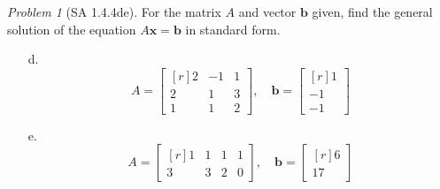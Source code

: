 \documentclass[fleqn,11pt]{paper}
\theoremstyle{remark}
\newtheorem{problem}{Problem}
\renewcommand{\vec}[1]{\mathbf{#1}}
\newcommand{\<}{\ensuremath{\langle}}
\renewcommand{\>}{\ensuremath{\rangle}}
\newcommand\vb{\vec{b}}
\newcommand\vx{\vec{x}}
\begin{document}
\begin{problem}[SA 1.4.4de]
  For the matrix $A$ and vector $\vb$ given, find the general solution of the
  equation $A\vx = \vb$ in standard form. 
\begin{enumerate}[a.]

\item[d.]
\[
A = 
\begin{bmatrix*}[r]
  2 & -1 & 1\\
  2 & 1 & 3\\
  1 & 1 & 2
\end{bmatrix*},
\quad
\vb = \begin{bmatrix*}[r] 1\\ -1 \\ -1 \end{bmatrix*}
\]

\item[e.]
\[
A = 
\begin{bmatrix*}[r]
  1 & 1 & 1 & 1\\
  3 & 3 & 2 & 0
\end{bmatrix*},
\quad
\vb = \begin{bmatrix*}[r] 6\\ 17 \end{bmatrix*}
\]

\end{enumerate}
\end{problem}

\newpage

\end{document}
